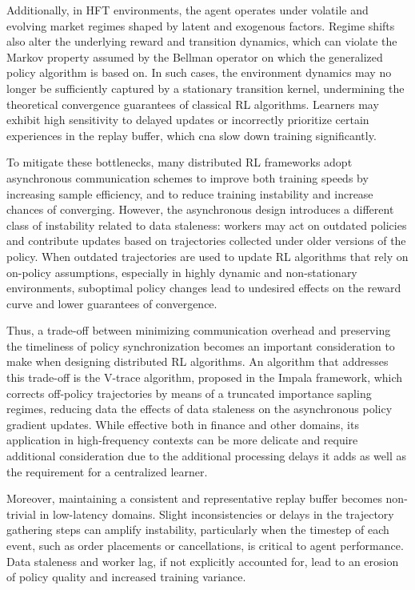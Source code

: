 Additionally, in HFT environments, the agent operates under volatile and evolving market regimes shaped by latent and exogenous factors.
Regime shifts also alter the underlying reward and transition dynamics, which can violate the Markov property assumed by the Bellman operator
on which the generalized policy algorithm is based on.
In such cases, the environment dynamics may no longer be sufficiently captured by a stationary transition kernel,
undermining the theoretical convergence guarantees of classical RL algorithms.
Learners may exhibit high sensitivity to delayed updates or incorrectly prioritize certain experiences in the replay buffer,
which cna slow down training significantly.

To mitigate these bottlenecks, many distributed RL frameworks adopt asynchronous communication schemes
to improve both training speeds by increasing sample efficiency, and to reduce training instability and increase chances of converging.
However, the asynchronous design introduces a different class of instability related to data staleness:
workers may act on outdated policies and contribute updates based on trajectories collected under older versions of the policy.
When outdated trajectories are used to update RL algorithms that rely on on-policy assumptions,
especially in highly dynamic and non-stationary environments,
suboptimal policy changes lead to undesired effects on the reward curve and lower guarantees of convergence.

Thus, a trade-off between minimizing communication overhead and preserving the timeliness of policy synchronization
becomes an important consideration to make when designing distributed RL algorithms.
An algorithm that addresses this trade-off is the V-trace algorithm, proposed in the Impala framework,
which corrects off-policy trajectories by means of a truncated importance sapling regimes,
reducing data the effects of data staleness on the asynchronous policy gradient updates.
While effective both in finance and other domains, its application in high-frequency contexts can be more delicate
and require additional consideration due to the additional processing delays it adds as well as the requirement for a
centralized learner.

Moreover, maintaining a consistent and representative replay buffer becomes non-trivial in low-latency domains.
Slight inconsistencies or delays in the trajectory gathering steps can amplify instability,
particularly when the timestep of each event, such as order placements or cancellations, is critical to agent performance.
Data staleness and worker lag, if not explicitly accounted for, lead to an erosion of policy quality and increased training variance.

